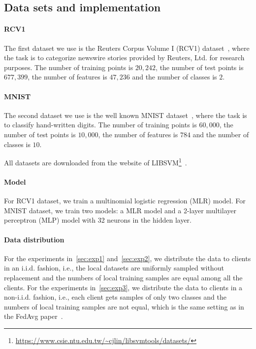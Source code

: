 \subsection{Data sets and implementation} \label{sec:details}
\paragraph{RCV1} The first dataset we use is the Reuters Corpus Volume I (RCV1) dataset~\citep{lewis2004rcv1}, where the task is to categorize newswire
stories provided by Reuters, Ltd. for research purposes. The number of training points is $20,242$, the number of test points is $677,399$, the number of features is $47,236$ and the number of classes is $2$.

\paragraph{MNIST} The second dataset we use is the well known MNIST dataset~\citep{lecun1998gradient}, where the task is to classify hand-written digits. The number of training points is $60,000$, the number of test points is $10,000$, the number of features is $784$ and the number of classes is $10$.

All datasets are downloaded from the website of LIBSVM\footnote{\url{https://www.csie.ntu.edu.tw/~cjlin/libsvmtools/datasets/}}~\citep{libsvm}.

\paragraph{Model} For RCV1 dataset, we train a multinomial logistic regression (MLR) model. For MNIST dataset, we train two models: a MLR model and a 2-layer multilayer perceptron (MLP) model with 32 neurons in the hidden layer. 

\paragraph{Data distribution} For the experiments in~\autoref{sec:exp1} and~\autoref{sec:exp2}, we distribute the data to clients in an i.i.d. fashion, i.e., the local datasets are uniformly sampled without replacement and the numbers of local training samples are equal among all the clients. For the experiments in~\autoref{sec:exp3},  we distribute the data to clients in a non-i.i.d. fashion, i.e., each client gets samples of only two classes and the numbers of local training samples are not equal, which is the same setting as in the FedAvg paper~\citep{mcmahan2017communication}.

